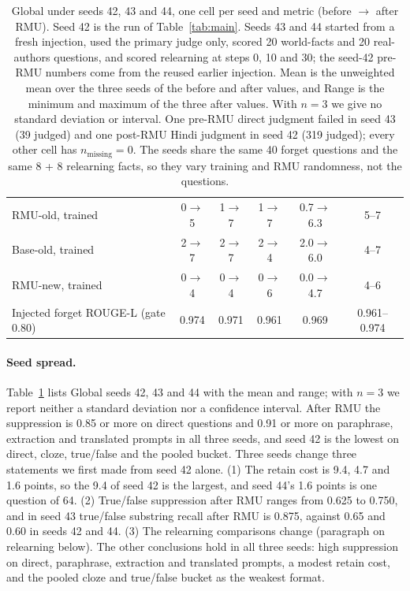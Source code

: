 \documentclass[10pt,twocolumn]{article}
\begin{document}
\begin{table}[t]
\begin{tabular}{@{}lccccc@{}}
RMU-old, trained & 0$\to$5 & 1$\to$7 & 1$\to$7 & 0.7$\to$6.3 & 5--7\\
Base-old, trained & 2$\to$7 & 2$\to$7 & 2$\to$4 & 2.0$\to$6.0 & 4--7\\
RMU-new, trained & 0$\to$4 & 0$\to$4 & 0$\to$6 & 0.0$\to$4.7 & 4--6\\
\midrule
Injected forget ROUGE-L (gate 0.80) & 0.974 & 0.971 & 0.961 & 0.969 & 0.961--0.974\\
\bottomrule
\end{tabular}
\caption{Global under seeds 42, 43 and 44, one cell per seed and metric (before $\to$ after RMU). Seed 42 is the run of Table~\ref{tab:main}. Seeds 43 and 44 started from a fresh injection, used the primary judge only, scored 20 world-facts and 20 real-authors questions, and scored relearning at steps 0, 10 and 30; the seed-42 pre-RMU numbers come from the reused earlier injection. Mean is the unweighted mean over the three seeds of the before and after values, and Range is the minimum and maximum of the three after values. With $n=3$ we give no standard deviation or interval. One pre-RMU direct judgment failed in seed 43 (39 judged) and one post-RMU Hindi judgment in seed 42 (319 judged); every other cell has $n_\text{missing}=0$. The seeds share the same 40 forget questions and the same 8 + 8 relearning facts, so they vary training and RMU randomness, not the questions.}
\label{tab:seeds}
\end{table}

\paragraph{Seed spread.} Table~\ref{tab:seeds} lists Global seeds 42, 43 and 44 with the mean and range; with $n=3$ we report neither a standard deviation nor a confidence interval. After RMU the suppression is 0.85 or more on direct questions and 0.91 or more on paraphrase, extraction and translated prompts in all three seeds, and seed 42 is the lowest on direct, cloze, true/false and the pooled bucket. Three seeds change three statements we first made from seed 42 alone. (1) The retain cost is 9.4, 4.7 and 1.6 points, so the 9.4 of seed 42 is the largest, and seed 44's 1.6 points is one question of 64. (2) True/false suppression after RMU ranges from 0.625 to 0.750, and in seed 43 true/false substring recall after RMU is 0.875, against 0.65 and 0.60 in seeds 42 and 44. (3) The relearning comparisons change (paragraph on relearning below). The other conclusions hold in all three seeds: high suppression on direct, paraphrase, extraction and translated prompts, a modest retain cost, and the pooled cloze and true/false bucket as the weakest format.
\end{document}
